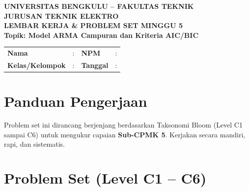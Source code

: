 \documentclass[11pt,a4paper]{article}
\begin{document}
\begin{center}
    {\large \textbf{\color{primaryblue}UNIVERSITAS BENGKULU -- FAKULTAS TEKNIK}}\\[0.1cm]
    {\large \textbf{\color{secondaryblue}JURUSAN TEKNIK ELEKTRO}}\\[0.25cm]
    {\LARGE \textbf{\color{primaryblue}LEMBAR KERJA \& PROBLEM SET MINGGU 5}}\\[0.1cm]
    {\normalsize \textbf{Topik: Model ARMA Campuran dan Kriteria AIC/BIC}}
\end{center}

\vspace{0.2cm}

\begin{tcolorbox}[colback=boxbg,colframe=primaryblue,arc=2mm,title=\textbf{Identitas Mahasiswa}]
\small
\begin{tabular}{p{2.5cm}p{5.5cm}p{2.5cm}p{4.5cm}}
\textbf{Nama} & : \dotfill & \textbf{NPM} & : \dotfill \\
\textbf{Kelas/Kelompok} & : \dotfill & \textbf{Tanggal} & : \dotfill \\
\end{tabular}
\end{tcolorbox}

\vspace{0.2cm}

\section{Panduan Pengerjaan}
Problem set ini dirancang berjenjang berdasarkan Taksonomi Bloom (Level C1 sampai C6) untuk mengukur capaian \textbf{Sub-CPMK 5}. Kerjakan secara mandiri, rapi, dan sistematis.

\section{Problem Set (Level C1 -- C6)}
\end{document}
